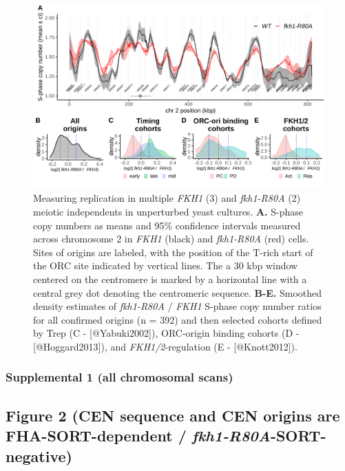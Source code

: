 \documentclass[
]{article}
\begin{document}
\begin{figure}

{\centering \includegraphics[width=0.85\linewidth]{./images/Figure_1_v_2022-11-08} 

}

\caption{\tiny Measuring replication in multiple \emph{FKH1} (3) and \emph{fkh1-R80A} (2) meiotic independents in unperturbed yeast cultures. \textbf{A.} S-phase copy numbers as means and 95\% confidence intervals measured across chromosome 2 in \emph{FKH1} (black) and \emph{fkh1-R80A} (red) cells. Sites of origins are labeled, with the position of the T-rich start of the ORC site indicated by vertical lines. The a 30 kbp window centered on the centromere is marked by a horizontal line with a central grey dot denoting the centromeric sequence. \textbf{B-E.} Smoothed density estimates of \emph{fkh1-R80A} / \emph{FKH1} S-phase copy number ratios for all confirmed origins (n = 392) and then selected cohorts defined by Trep (C - {[}@Yabuki2002{]}), ORC-origin binding cohorts (D - {[}@Hoggard2013{]}), and \emph{FKH1/2}-regulation (E - {[}@Knott2012{]}).}\label{fig:fig1}
\end{figure}

\hypertarget{supplemental-1-all-chromosomal-scans}{%
\subsubsection{Supplemental 1 (all chromosomal scans)}\label{supplemental-1-all-chromosomal-scans}}

\hypertarget{figure-2-cen-sequence-and-cen-origins-are-fha-sort-dependent-fkh1-r80a-sort-negative}{%
\subsection{\texorpdfstring{Figure 2 (CEN sequence and CEN origins are FHA-SORT-dependent / \emph{fkh1-R80A}-SORT-negative)}{Figure 2 (CEN sequence and CEN origins are FHA-SORT-dependent / fkh1-R80A-SORT-negative)}}\label{figure-2-cen-sequence-and-cen-origins-are-fha-sort-dependent-fkh1-r80a-sort-negative}}
\end{document}
